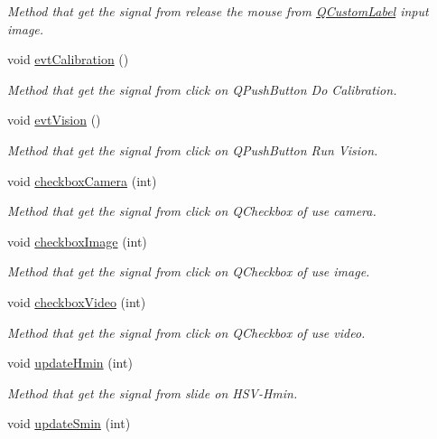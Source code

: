 \begin{DoxyCompactItemize}
\begin{DoxyCompactList}\small\item\em Method that get the signal from release the mouse from \hyperlink{classQCustomLabel}{Q\-Custom\-Label} input image. \end{DoxyCompactList}\item 
void \hyperlink{classMainWindow_a0057a9faf5830055b8a2117a5d1a9ffa}{evt\-Calibration} ()
\begin{DoxyCompactList}\small\item\em Method that get the signal from click on Q\-Push\-Button Do Calibration. \end{DoxyCompactList}\item 
void \hyperlink{classMainWindow_a202a597ababe8aa1fd3c821e703599b6}{evt\-Vision} ()
\begin{DoxyCompactList}\small\item\em Method that get the signal from click on Q\-Push\-Button Run Vision. \end{DoxyCompactList}\item 
void \hyperlink{classMainWindow_afb1276b4a282f8678e25b0ec1a0195c9}{checkbox\-Camera} (int)
\begin{DoxyCompactList}\small\item\em Method that get the signal from click on Q\-Checkbox of use camera. \end{DoxyCompactList}\item 
void \hyperlink{classMainWindow_aa0266c5762b37479a888fba709aefbee}{checkbox\-Image} (int)
\begin{DoxyCompactList}\small\item\em Method that get the signal from click on Q\-Checkbox of use image. \end{DoxyCompactList}\item 
void \hyperlink{classMainWindow_a33f858356490a2440246af76ca922392}{checkbox\-Video} (int)
\begin{DoxyCompactList}\small\item\em Method that get the signal from click on Q\-Checkbox of use video. \end{DoxyCompactList}\item 
\hypertarget{classMainWindow_afffdad16c118e2351cec7b47c243e9b1}{void \hyperlink{classMainWindow_afffdad16c118e2351cec7b47c243e9b1}{update\-Hmin} (int)}\label{classMainWindow_afffdad16c118e2351cec7b47c243e9b1}

\begin{DoxyCompactList}\small\item\em Method that get the signal from slide on H\-S\-V-\/\-Hmin. \end{DoxyCompactList}\item 
\hypertarget{classMainWindow_a11f3aa0b929685232b671cd378d31972}{void \hyperlink{classMainWindow_a11f3aa0b929685232b671cd378d31972}{update\-Smin} (int)}\label{classMainWindow_a11f3aa0b929685232b671cd378d31972}


\end{DoxyCompactItemize}
